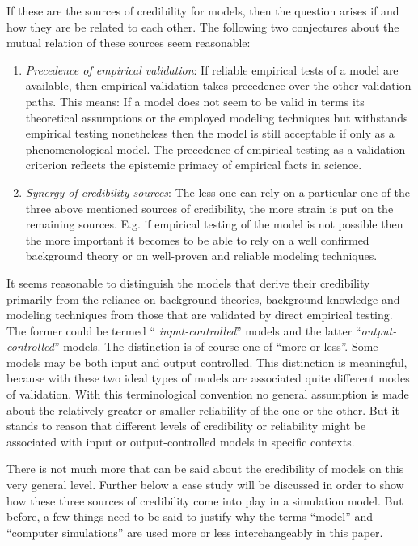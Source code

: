 \documentclass[onecollarge]{STJour}
\numberwithin{equation}{section}
\begin{document}
If these are the sources of credibility for models, then the question
arises if and how they are be related to each other.  The following two
conjectures about the mutual relation of these sources seem reasonable:

\begin{enumerate}
  
\item {\em Precedence of empirical validation}:\label{precedence} If
reliable empirical tests of a model are available, 
then empirical validation takes precedence over the other validation
paths. This means: If a model does not seem to be valid in terms its
theoretical assumptions or the employed modeling techniques 
but withstands empirical testing nonetheless
then the model is still acceptable if only as a phenomenological model.
The precedence of empirical testing as a validation criterion reflects 
the epistemic primacy of empirical facts in science. 

\item {\em Synergy of credibility sources}:\label{synergy} The less one
can rely on a particular one of the three above mentioned sources of
credibility, the more strain is put on the remaining sources. E.g. if
empirical testing of the model is not possible then the more important it
becomes to be able to rely on a well confirmed background theory or on
well-proven and reliable modeling techniques.

\end{enumerate}

It seems reasonable to distinguish the models that derive their
credibility primarily from the reliance on background theories,
background knowledge and modeling techniques from those that are
validated by direct empirical testing. The former could be termed ``{\em
input-controlled}'' models and the latter ``{\em output-controlled}''
models. The distinction is of course one of ``more or less''. Some models
may be both input and output controlled. This distinction is meaningful,
because with these two ideal types of models are associated quite
different modes of validation. With this terminological convention no
general assumption is made about the relatively greater or smaller
reliability of the one or the other. But it stands to reason that
different levels of credibility or reliability might be associated with
input or output-controlled models in specific contexts.

There is not much more that can be said about the credibility of models
on this very general level. Further below a case study will be discussed
in order to show how these three sources of credibility come into play in
a simulation model. But before, a few things need to be said to justify
why the terms ``model'' and ``computer simulations'' are used more or less
interchangeably in this paper.
\end{document}
